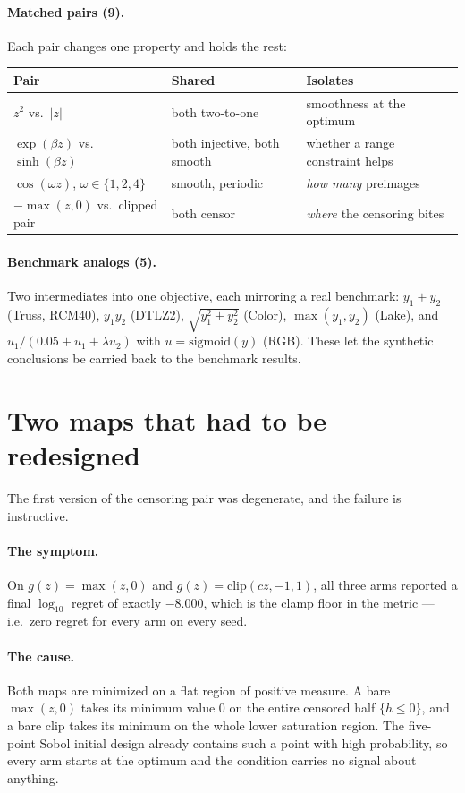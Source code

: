 \documentclass[11pt]{article}
\begin{document}
\paragraph{Matched pairs (9).} Each pair changes one property and holds the rest:
\begin{center}
\begin{tabular}{lll}
\toprule
Pair & Shared & Isolates \\
\midrule
$z^2$ vs.\ $|z|$ & both two-to-one & smoothness at the optimum \\
$\exp(\beta z)$ vs.\ $\sinh(\beta z)$ & both injective, both smooth & whether a range constraint helps \\
$\cos(\omega z)$, $\omega\in\{1,2,4\}$ & smooth, periodic & \emph{how many} preimages \\
$-\max(z,0)$ vs.\ clipped pair & both censor & \emph{where} the censoring bites \\
\bottomrule
\end{tabular}
\end{center}

\paragraph{Benchmark analogs (5).} Two intermediates into one objective, each
mirroring a real benchmark: $y_1+y_2$ (Truss, RCM40), $y_1y_2$ (DTLZ2),
$\sqrt{y_1^2+y_2^2}$ (Color), $\max(y_1,y_2)$ (Lake), and
$u_1/(0.05+u_1+\lambda u_2)$ with $u=\mathrm{sigmoid}(y)$ (RGB). These let the
synthetic conclusions be carried back to the benchmark results.

\section{Two maps that had to be redesigned}
\label{sec:degenerate}

The first version of the censoring pair was degenerate, and the failure is
instructive.

\paragraph{The symptom.} On $g(z)=\max(z,0)$ and
$g(z)=\mathrm{clip}(cz,-1,1)$, all three arms reported a final $\log_{10}$
regret of exactly $-8.000$, which is the clamp floor in the metric --- i.e.\ zero
regret for every arm on every seed.

\paragraph{The cause.} Both maps are minimized on a flat region of positive
measure. A bare $\max(z,0)$ takes its minimum value $0$ on the entire censored
half $\{h\le0\}$, and a bare clip takes its minimum on the whole lower
saturation region. The five-point Sobol initial design already contains such a
point with high probability, so every arm starts at the optimum and the
condition carries no signal about anything.
\end{document}
